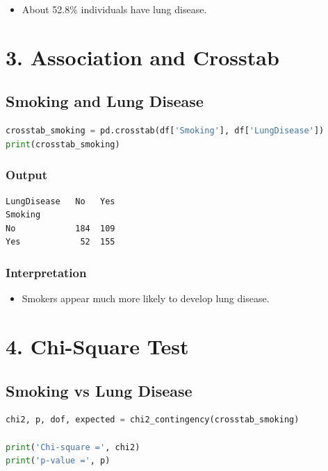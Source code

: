 \documentclass[12pt]{article}
\begin{document}
\begin{itemize}
\item About 52.8\% individuals have lung disease.
\end{itemize}

\section*{3. Association and Crosstab}

\subsection*{Smoking and Lung Disease}

\begin{lstlisting}[language=Python]
crosstab_smoking = pd.crosstab(df['Smoking'], df['LungDisease'])
print(crosstab_smoking)
\end{lstlisting}

\subsubsection*{Output}

\begin{verbatim}
LungDisease   No   Yes
Smoking
No            184  109
Yes            52  155
\end{verbatim}

\subsubsection*{Interpretation}

\begin{itemize}
\item Smokers appear much more likely to develop lung disease.
\end{itemize}

\section*{4. Chi-Square Test}

\subsection*{Smoking vs Lung Disease}

\begin{lstlisting}[language=Python]
chi2, p, dof, expected = chi2_contingency(crosstab_smoking)

print('Chi-square =', chi2)
print('p-value =', p)
\end{lstlisting}
\end{document}
